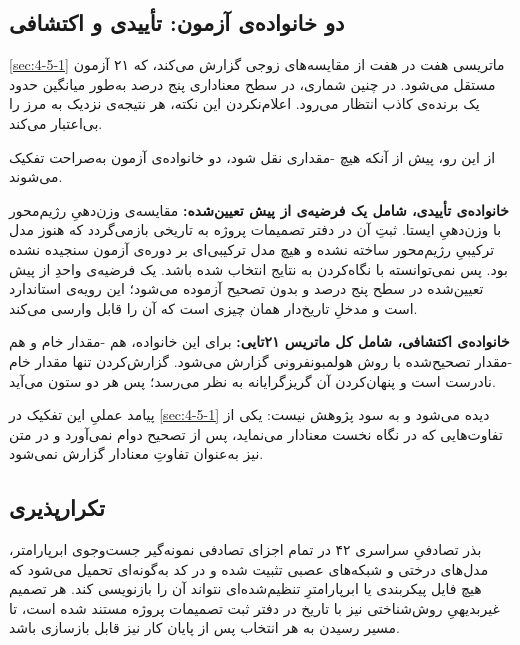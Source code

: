 \subsection*{دو خانواده‌ی آزمون: تأییدی و اکتشافی}

\cref{sec:4-5-1} ماتریسی هفت در هفت از مقایسه‌های زوجی گزارش می‌کند، که ۲۱ آزمون مستقل
می‌شود. در چنین شماری، در سطح معناداری پنج درصد به‌طور میانگین حدود یک برنده‌ی کاذب
انتظار می‌رود. اعلام‌نکردن این نکته، هر نتیجه‌ی نزدیک به مرز را بی‌اعتبار می‌کند.

از این رو، پیش از آنکه هیچ -مقداری نقل شود، دو خانواده‌ی آزمون به‌صراحت تفکیک
می‌شوند.

\textbf{خانواده‌ی تأییدی، شامل یک فرضیه‌ی از پیش تعیین‌شده:} مقایسه‌ی وزن‌دهیِ رژیم‌محور
با وزن‌دهیِ ایستا. ثبتِ آن در دفتر تصمیمات پروژه به تاریخی بازمی‌گردد که هنوز
مدل ترکیبیِ رژیم‌محور ساخته نشده و هیچ مدل ترکیبی‌ای بر دوره‌ی آزمون سنجیده نشده بود.
پس نمی‌توانسته با نگاه‌کردن به نتایج انتخاب شده باشد. یک فرضیه‌ی واحدِ از
پیش تعیین‌شده در سطح پنج درصد و بدون تصحیح آزموده می‌شود؛ این رویه‌ی استاندارد است و
مدخلِ تاریخ‌دار همان چیزی است که آن را قابل وارسی می‌کند.

\textbf{خانواده‌ی اکتشافی، شامل کل ماتریس ۲۱تایی:} برای این خانواده، هم
-مقدار خام و هم -مقدار تصحیح‌شده با روش هولمبونفرونی گزارش می‌شود.
گزارش‌کردن تنها مقدار خام نادرست است و پنهان‌کردن آن گریزگرایانه به نظر می‌رسد؛ پس
هر دو ستون می‌آید.

پیامد عملیِ این تفکیک در \cref{sec:4-5-1} دیده می‌شود و به سود پژوهش نیست: یکی از
تفاوت‌هایی که در نگاه نخست معنادار می‌نماید، پس از تصحیح دوام نمی‌آورد و در متن نیز
به‌عنوان تفاوتِ معنادار گزارش نمی‌شود.

\subsection*{تکرارپذیری}

بذر تصادفیِ سراسری ۴۲ در تمام اجزای تصادفی  نمونه‌گیر جست‌وجوی ابرپارامتر،
مدل‌های درختی و شبکه‌های عصبی  تثبیت شده و در کد به‌گونه‌ای تحمیل می‌شود که
هیچ فایل پیکربندی یا ابرپارامترِ تنظیم‌شده‌ای نتواند آن را بازنویسی کند. هر تصمیم
غیربدیهیِ روش‌شناختی نیز با تاریخ در دفتر ثبت تصمیمات پروژه مستند شده است، تا مسیر
رسیدن به هر انتخاب پس از پایان کار نیز قابل بازسازی باشد.
